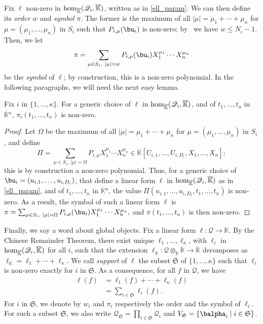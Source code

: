 \documentclass[12pt]{article}
\newcommand{\residueI}{\mathscr{Q}}
\def\dg{\kappa}
\def\K{\mathbb{K}}
\def\K {\ensuremath{\mathbb{K}}}
\def\Kbar {{\ensuremath{\overline{\mathbb{K}}}}}
\begin{document}
Fix $\ell$ non-zero in ${\rm hom}_\Kbar(\residueI_i,\Kbar)$, written
as in \cref{ell_param}. We can then
define its {\em order} $w$ and {\em symbol} $\pi$. The former is
the maximum of all $|\mu|=\mu_1+\cdots+\mu_n$ for
$\mu=(\mu_1,\dots,\mu_n)$ in $S_i$ such that $P_{i,\mu}(\bu_i)$ is
non-zero; by~\cite[Lemma~3.3]{Mourrain97} we have $w \le
N_i-1$. Then, we let
$$\pi =\sum_{\mu \in S_i,\ |\mu|=w}P_{i,\mu}(\bu_i) X_1^{\mu_1} \cdots
X_n^{\mu_n}$$ be the {\em symbol} of $\ell$; by construction,
this is a non-zero polynomial. In the following paragraphs, we will
need the next easy lemma.

\begin{lemma}\label{lemma:symbol0}
  Fix $i$ in $\{1,\dots,\dg\}$. For a generic choice of $\ell$ in
  ${\rm hom}_\Kbar(\residueI_i,\Kbar)$, and of $t_1,\dots,t_n$ in $\Kbar{}^n$,
  $\pi_i(t_1,\dots,t_n)$ is non-zero.
\end{lemma}
\begin{proof}
  Let $\Omega$ be the maximum of all $|\mu|=\mu_1+\cdots+\mu_n$ for
  $\mu=(\mu_1,\dots,\mu_n)$ in $S_i$, and define 
	$$\Pi =\sum_{\mu \in S_i,\ |\mu|=\Omega}P_{i,\mu} X_1^{\mu_1}
  \cdots X_n^{\mu_n} \in
  \Kbar[U_{i,1},\dots,U_{i,D_i},X_1,\dots,X_n];$$ this is by
  construction a non-zero polynomial.  Thus, for a generic choice of
  $\bu_i=(u_{i,1},\dots,u_{i,D_i})$, that define a linear form
  $\ell$ in ${\rm hom}_\Kbar(\residueI_i,\Kbar)$ as in \cref{ell_param},
  and of $t_1,\dots,t_n$ in $\Kbar{}^n$, the value
  $\Pi(u_{i,1},\dots,u_{i,D_i},t_1,\dots,t_n)$ is non-zero. As a
  result, the symbol of such a linear form $\ell$ is $\pi
  =\sum_{\mu \in S_i,\ |\mu|=\Omega}P_{i,\mu}(\bu_i) X_1^{\mu_1}
  \cdots X_n^{\mu_n},$ and $\pi(t_1,\dots,t_n)$ is then non-zero.
\end{proof}

Finally, we say a word about global objects.  Fix a linear form $\ell:
\residueI \to \K$. By the Chinese Remainder Theorem, there exist unique
$\ell_1,\dots,\ell_\dg$, with $\ell_i$ in ${\rm hom}_\Kbar(\residueI_i,\Kbar)$
for all $i$, such that the extension $\ell_\Kbar: \residueI\otimes_\K \Kbar
\to \Kbar$ decomposes as $\ell_\Kbar = \ell_1 + \cdots + \ell_\dg$. We
call {\em support} of $\ell$ the subset $\mathfrak{S}$ of
$\{1,\dots,\dg\}$ such that $\ell_i$ is non-zero exactly for $i$ in
$\mathfrak{S}$.  As a consequence, for all $f$ in $\residueI$, we have
\begin{align}\label{eq:fui}
\ell(f) &= \ell_1(f) + \cdots + \ell_\dg(f)\nonumber\\
&=  \sum_{i \in \mathfrak{S}} \ell_i(f).
\end{align}
For $i$ in $\mathfrak{S}$, we denote by $w_i$ and $\pi_i$ respectively
the order and the symbol of $\ell_i$. For such a subset
$\mathfrak{S}$, we also write $\residueI_\mathfrak{S}=\prod_{i \in
  \mathfrak{S}} \residueI_i$ and $V_\mathfrak{S}=
\{\balpha_i \mid i \in \mathfrak{S}\}$.
\end{document}
